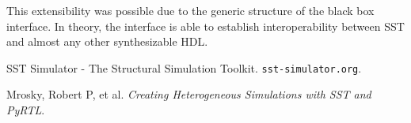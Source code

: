 \documentclass{article}
\begin{document}
    This extensibility was possible due to the generic structure of the black box interface. In
    theory, the interface is able to establish interoperability between SST and almost any other
    synthesizable HDL.


  \begin{thebibliography}{5}

     SST Simulator - The Structural Simulation Toolkit. \texttt{sst-simulator.org}.

     Mrosky, Robert P, et al.
    \textit{Creating Heterogeneous Simulations with SST and PyRTL}.

  \end{thebibliography}
\end{document}
